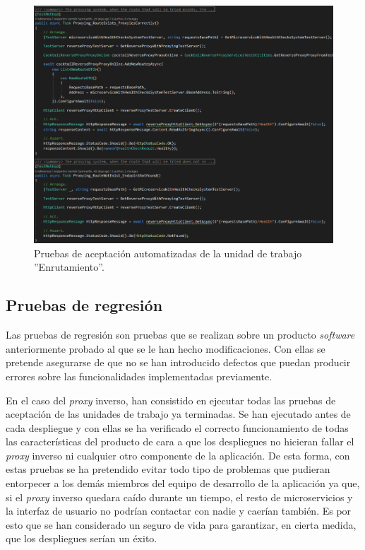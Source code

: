 \documentclass[11pt,spanish,listoffigures]{tfgetsinf}
\begin{document}
\begin{figure}[ht]
\centering
\includegraphics[width=1\textwidth]{imagenes/testsEnrutamiento}
\caption{Pruebas de aceptación automatizadas de la unidad de trabajo ''Enrutamiento''.}
	\label{testsEnrutamiento}
\end{figure}


		\subsection{Pruebas de regresión} \label{pruebasDeRegresion}

Las pruebas de regresión son pruebas que se realizan sobre un producto \emph{software} anteriormente probado al que se le han hecho modificaciones. Con ellas se pretende asegurarse de que no se han introducido defectos que puedan producir errores sobre las funcionalidades implementadas previamente. 

En el caso del \emph{proxy} inverso, han consistido en ejecutar todas las pruebas de aceptación de las unidades de trabajo ya terminadas. Se han ejecutado antes de cada despliegue y con ellas se ha verificado el correcto funcionamiento de todas las características del producto de cara a que los despliegues no hicieran fallar el \emph{proxy} inverso ni cualquier otro componente de la aplicación. De esta forma, con estas pruebas se ha pretendido evitar todo tipo de problemas que pudieran entorpecer a los demás miembros del equipo de desarrollo de la aplicación ya que, si el \emph{proxy} inverso quedara caído durante un tiempo, el resto de microservicios y la interfaz de usuario no podrían contactar con nadie y caerían también. Es por esto que se han considerado un seguro de vida para garantizar, en cierta medida, que los despliegues serían un éxito.
\end{document}
